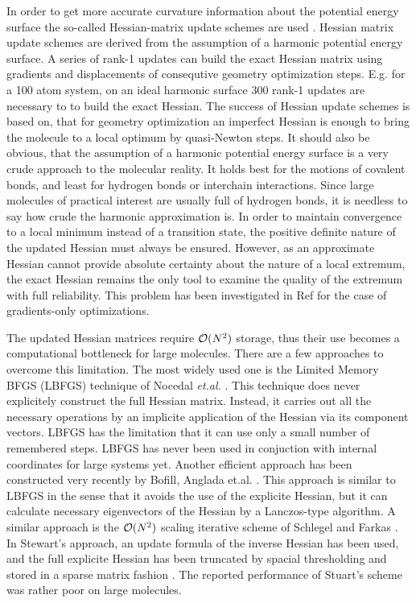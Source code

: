 \documentclass[prl,aps,twocolumn,showpacs,twocolumngrid,superbib]{revtex4}
\begin{document}
In order to get more accurate curvature information about the 
potential energy surface the so-called Hessian-matrix update schemes
are used \cite{RFletcher}. 
Hessian matrix update schemes are derived from the assumption of a 
harmonic potential energy surface. A series of rank-1 updates
can build the exact Hessian matrix using gradients and displacements
of consequtive geometry optimization steps.
E.g. for a 100 atom system, on an ideal harmonic surface 300 rank-1
updates are necessary to to build the exact Hessian. The success
of Hessian update schemes is based on, that for geometry optimization
an imperfect Hessian is enough to bring the molecule to a local 
optimum by quasi-Newton steps. 
It should also be obvious, that the assumption of a harmonic potential energy 
surface is a very crude approach to the molecular reality. 
It holds best for the motions of covalent bonds, and least for
hydrogen bonds or interchain interactions. Since large molecules of practical
interest are usually full of hydrogen bonds, it is needless to say how
crude the harmonic approximation is.
In order to maintain convergence to a local
minimum instead of a transition state, the positive definite nature
of the updated Hessian must always be ensured. However, as 
an approximate Hessian cannot provide absolute certainty about the 
nature of a local extremum, the exact Hessian remains the only tool
to examine the quality of the extremum with full reliability. 
This problem has been investigated
in Ref \cite{Wales_saddlepoint} for the case of 
gradients-only optimizations.

The updated Hessian matrices require ${\cal{O}}(N^{2})$ storage, thus
their use becomes a computational bottleneck for large molecules.
There are a few approaches to overcome this limitation.
The most widely used one is the Limited Memory BFGS (LBFGS) 
technique of Nocedal
{\it et.al.} \cite{nocedal_lbgs}. This technique does never explicitely 
construct the full Hessian matrix. Instead, it carries out all 
the necessary operations by an implicite application of the Hessian
via its component vectors. LBFGS
has the limitation that it can use only a small number of remembered
steps.
LBFGS has never been used in conjuction with internal coordinates
for large systems yet.
Another efficient approach has been constructed very recently by Bofill,
Anglada et.al. \cite{bofill_lanczos}. This approach is similar
to LBFGS in the sense that it avoids the use of the explicite
Hessian, but it can calculate necessary eigenvectors of the 
Hessian by a Lanczos-type algorithm. A
similar approach is the ${\cal{O}}(N^{2})$ scaling iterative
scheme of Schlegel and Farkas \cite{schlegel_on2iter}.
In Stewart's approach, an update
formula of the inverse Hessian has been used, and the full explicite
Hessian has been truncated by spacial thresholding and stored in a 
sparse matrix fashion \cite{Stewart_crambin_opt}. 
The reported performance
of Stuart's scheme was rather poor on large molecules.
\end{document}
